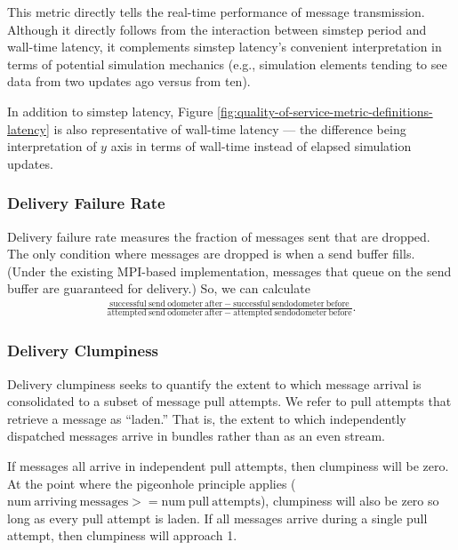 This metric directly tells the real-time performance of message transmission.
Although it directly follows from the interaction between simstep period and wall-time latency, it complements simstep latency's convenient interpretation in terms of potential simulation mechanics (e.g., simulation elements tending to see data from two updates ago versus from ten).

In addition to simstep latency, Figure \ref{fig:quality-of-service-metric-definitions-latency} is also representative of wall-time latency --- the difference being interpretation of $y$ axis in terms of wall-time instead of elapsed simulation updates.

\subsubsection{Delivery Failure Rate} \label{sec:delivery-failure-rate-metric}

Delivery failure rate measures the fraction of messages sent that are dropped.
The only condition where messages are dropped is when a send buffer fills.
(Under the existing MPI-based implementation, messages that queue on the send buffer are guaranteed for delivery.)
So, we can calculate
\begin{align*}
  \frac{
    \mathrm{successful\ send\ odometer\ after} - \mathrm{successful\ send odometer\ before}
  }{
    \mathrm{attempted\ send\ odometer\ after} - \mathrm{attempted\ send odometer\ before}
  }.
\end{align*}

\subsubsection{Delivery Clumpiness} \label{sec:delivery-clumpiness-metric}

Delivery clumpiness seeks to quantify the extent to which message arrival is consolidated to a subset of message pull attempts.
We refer to pull attempts that retrieve a message as ``laden.''
That is, the extent to which independently dispatched messages arrive in bundles rather than as an even stream.

If messages all arrive in independent pull attempts, then clumpiness will be zero.
At the point where the pigeonhole principle applies ($\mathrm{num\ arriving\ messages} >= \mathrm{num\ pull\ attempts}$), clumpiness will also be zero so long as every pull attempt is laden.
If all messages arrive during a single pull attempt, then clumpiness will approach 1.

